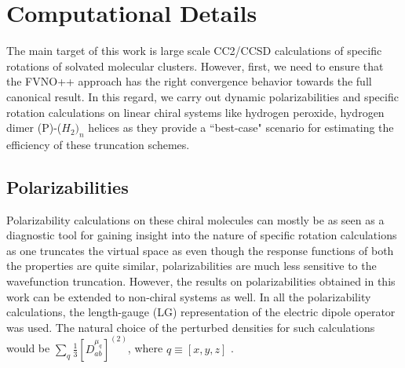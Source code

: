 \section{Computational Details}
The main target of this work is large scale CC2\cite{Christiansen95:CC2}/CCSD calculations of specific 
rotations of solvated molecular clusters. However, first, we need to ensure 
that the FVNO++ approach has the right convergence behavior towards the full
canonical result. In this regard, we carry out dynamic polarizabilities 
and specific rotation calculations on linear chiral systems like 
hydrogen peroxide, hydrogen dimer (P)-($H_2)_n$ helices as they provide a 
``best-case" scenario for estimating the efficiency of these truncation schemes. 
\subsection{Polarizabilities}
Polarizability calculations on these chiral molecules can mostly be as seen as a diagnostic 
tool for gaining insight into the nature of specific rotation calculations as one 
truncates the virtual space as even though the response functions of 
both the properties are quite similar, polarizabilities are much less sensitive to the 
wavefunction truncation. However, the results on polarizabilities obtained in this work
can be extended to non-chiral systems as well. In all the polarizability calculations, the length-gauge 
(LG) representation of the electric dipole operator was used. The natural choice of 
the perturbed densities for such calculations would be $\sum\limits_q \frac{1}{3}[{D^{\mu_q}_{ab}}]^{(2)}$,
where $q \equiv [x,y,z]$ . 
